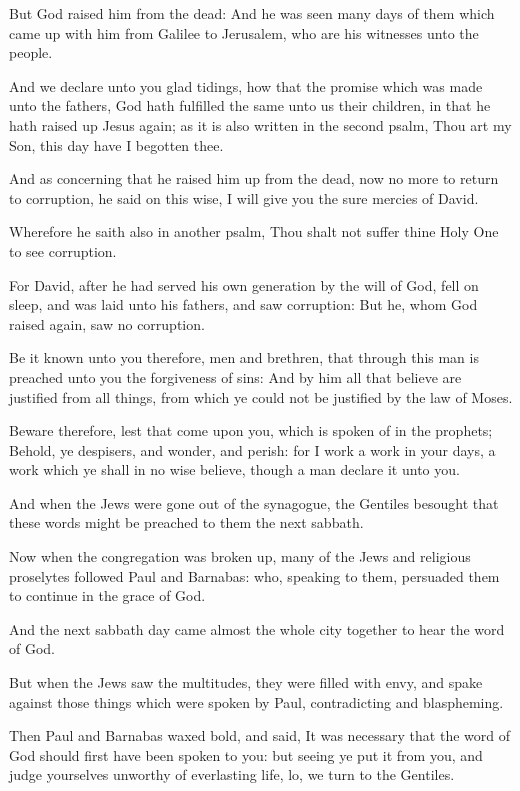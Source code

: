 \verse But God raised him from the dead: \verse And he was seen many days of them which came up with him from Galilee to Jerusalem, who are his witnesses unto the people.

\verse And we declare unto you glad tidings, how that the promise which was made unto the fathers, \verse God hath fulfilled the same unto us their children, in that he hath raised up Jesus again; as it is also written in the second psalm, Thou art my Son, this day have I begotten thee.

\verse And as concerning that he raised him up from the dead, now no more to return to corruption, he said on this wise, I will give you the sure mercies of David.

\verse Wherefore he saith also in another psalm, Thou shalt not suffer thine Holy One to see corruption.

\verse For David, after he had served his own generation by the will of God, fell on sleep, and was laid unto his fathers, and saw corruption: \verse But he, whom God raised again, saw no corruption.

\verse Be it known unto you therefore, men and brethren, that through this man is preached unto you the forgiveness of sins: \verse And by him all that believe are justified from all things, from which ye could not be justified by the law of Moses.

\verse Beware therefore, lest that come upon you, which is spoken of in the prophets; \verse Behold, ye despisers, and wonder, and perish: for I work a work in your days, a work which ye shall in no wise believe, though a man declare it unto you.

\verse And when the Jews were gone out of the synagogue, the Gentiles besought that these words might be preached to them the next sabbath.

\verse Now when the congregation was broken up, many of the Jews and religious proselytes followed Paul and Barnabas: who, speaking to them, persuaded them to continue in the grace of God.

\verse And the next sabbath day came almost the whole city together to hear the word of God.

\verse But when the Jews saw the multitudes, they were filled with envy, and spake against those things which were spoken by Paul, contradicting and blaspheming.

\verse Then Paul and Barnabas waxed bold, and said, It was necessary that the word of God should first have been spoken to you: but seeing ye put it from you, and judge yourselves unworthy of everlasting life, lo, we turn to the Gentiles.

